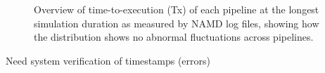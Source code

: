 \begin{figure}[!htbp]
  \centering
  \begin{minipage}[b]{0.55\textwidth}
  \centering
  \end{minipage}
  \begin{minipage}[b]{0.44\textwidth}
  \centering
  \end{minipage}
\caption{Overview of time-to-execution (Tx) of each pipeline at the longest simulation duration as measured by NAMD log files, showing how the distribution shows no abnormal fluctuations across pipelines.}
\label{fig:namd_logs}
\end{figure}








Need system verification of timestamps (errors) 




